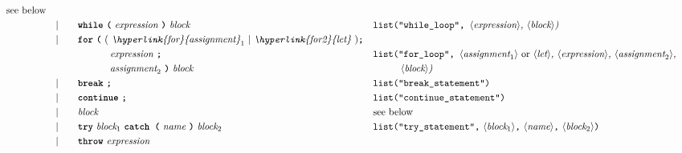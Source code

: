 \begin{alignat*}{9}
                                                           && \textrm{see below}\\
&&                       && |   &\quad && \textbf{\texttt{while}}\  
                                   \textbf{\texttt{(}}\  \textit{expression} \ \textbf{\texttt{)}} \
                                   \textit{block}
                                                           && \texttt{list("while\_loop",  } \langle \textit{expression}\rangle \textit{,  } \langle \textit{block}\rangle \textit{)} \\
&&                       && |   &\quad && \textbf{\texttt{for}}\ \textbf{\texttt{(}} \ 
                                          (\ \textit{\hyperlink{for}{assignment}}_1 \ | \  \textit{\hyperlink{for2}{let}}\ ) \textbf{\texttt{;}} \\
&&                       &&     &\quad && \ \ \ \ \ \ \ \ \ \ \textit{expression} \ \textbf{\texttt{;}} && \texttt{list("for\_loop",  } \langle \textit{assignment}_1\rangle\ \textrm{or}\ \langle \textit{let}\rangle \textit{,  } \langle \textit{expression}\rangle \textit{,  } \langle \textit{assignment}_2\rangle \textit{,}\\
&&                       &&     &\quad && \ \ \ \ \ \ \ \ \ \ \textit{assignment}_2 \ \textbf{\texttt{)}} \  \textit{block}
                                            && \texttt{ }\ \ \ \ \ \ \ \langle \textit{block}\rangle \textit{)} \\
&&                       && |   &\quad && \textbf{\texttt{break}}\ \textbf{\texttt{;}}
                                                           && \texttt{list("break\_statement")} \\
&&                       && |   &\quad && \textbf{\texttt{continue}}\ \textbf{\texttt{;}}
                                                           && \texttt{list("continue\_statement")} \\
&&                       && |   &\quad &&  \textit{block} 
                                                           && \textrm{see below}\\
&&                       && |   &\quad &&  \textbf{\texttt{try}}\ \textit{block}_1 \ \textbf{\texttt{catch (}}\ \textit{name}\ \textbf{\texttt{)}}\ \textit{block}_2
                                                           && \texttt{list("try\_statement",}\ \langle  \textit{block}_1 \rangle \texttt{,}\ \langle  \textit{name} \rangle \texttt{,}\ \langle  \textit{block}_2 \rangle \texttt{)} \\
&&                       && |   &\quad &&  \textbf{\texttt{throw}}\ \textit{expression}

\end{alignat*}
